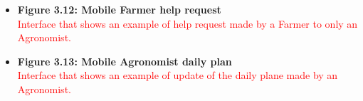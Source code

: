 \begin{itemize}
    \item \textbf{Figure 3.12: Mobile Farmer help request}\\ 
    \textcolor{red}{Interface that shows an example of help request made by a Farmer to only an Agronomist.}
\end{itemize}
\begin{itemize}
    \item \textbf{Figure 3.13: Mobile Agronomist daily plan}\\ 
    \textcolor{red}{Interface that shows an example of update of the daily plane made by an Agronomist.}
\end{itemize}
\newpage